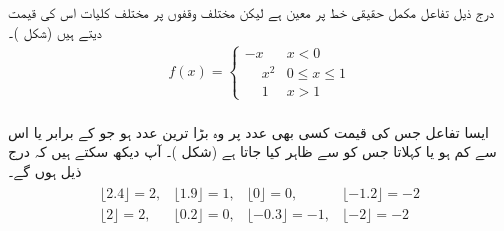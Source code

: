 درج ذیل تفاعل مکمل حقیقی خط پر معین ہے لیکن  مختلف وقفوں پر مختلف کلیات   اس کی قیمت دیتے ہیں (شکل )۔
\begin{align*}
f(x)=
\begin{cases}
-x&x<0\\
\phantom{-}x^2&0\le x\le 1\\
\phantom{-}1&x>1
\end{cases}
\end{align*}
\\
ایسا تفاعل جس کی قیمت کسی بھی عدد  پر وہ بڑا ترین عدد ہو جو  کے برابر یا اس سے کم ہو   یا  کہلاتا جس کو  سے ظاہر کیا جاتا ہے (شکل )۔  آپ دیکھ سکتے ہیں کہ درج ذیل ہوں گے۔
\begin{align*}
\begin{array}{llll}
\lfloor 2.4 \rfloor=2,& \lfloor 1.9\rfloor=1,& \lfloor 0 \rfloor=0, & \lfloor -1.2\rfloor=-2\\
\lfloor 2\rfloor=2,& \lfloor 0.2\rfloor =0,& \lfloor -0.3\rfloor =-1,& \lfloor -2\rfloor=-2
\end{array}
\end{align*}
%
